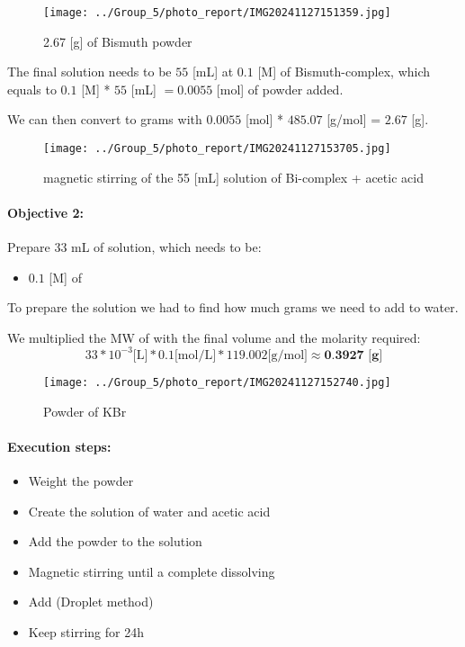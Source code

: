 \begin{figure}[ht]
    \centering
	\texttt{[image: ../Group\_5/photo\_report/IMG20241127151359.jpg]}
    \caption{2.67 [g] of Bismuth powder}
\end{figure}

\noindent The final solution needs to be $55$ [mL] at $0.1$ [M] of Bismuth-complex, which equals to $0.1$ [M] * $55$ [mL] $= 0.0055$ [mol] of powder added. 

\noindent We can then convert to grams with $0.0055$ [mol] * $485.07$ [g/mol] = $2.67$ [g].


\begin{figure}[ht]
    \centering
	\texttt{[image: ../Group\_5/photo\_report/IMG20241127153705.jpg]}
    \caption{magnetic stirring of the 55 [mL] solution of Bi-complex + acetic acid}
\end{figure}

\vspace{10pt}

\paragraph{Objective 2:} Prepare 33 mL of solution, which needs to be:
\begin{itemize}
    \item $0.1$ [M] of 
\end{itemize}

\noindent To prepare the  solution we had to find how much grams we need to add to water.

\noindent We multiplied the MW of  with the final volume and the molarity required:
$$33*10^{-3} \text{[L]} * 0.1 \text{[mol/L]} * 119.002 \text{[g/mol]} \approx \textbf{0.3927 [g]} $$

\begin{figure}[ht]
    \centering
	\texttt{[image: ../Group\_5/photo\_report/IMG20241127152740.jpg]}
    \caption{Powder of KBr}
\end{figure}

\paragraph{Execution steps:}
\begin{itemize}
    \item Weight the powder
    \item Create the solution of water and acetic acid
    \item Add the powder to the solution
    \item Magnetic stirring until a complete dissolving
    \item Add  (Droplet method) 
    \item Keep stirring for 24h
\end{itemize}

